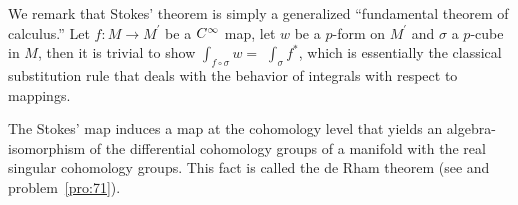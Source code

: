 \documentclass[../main]{subfiles}
\begin{document}
We remark that Stokes' theorem is simply a generalized ``fundamental theorem of calculus.'' Let $f: M \rightarrow M^{\prime}$ be a $C^\infty$ map, let $w$ be a $p$-form on $M^{\prime}$ and $\sigma$ a $p$-cube in $M$, then it is trivial to show $\int_{f \circ \sigma} w=$ $\int_{\sigma} f^\ast$, which is essentially the classical substitution rule that deals with the behavior of integrals with respect to mappings.

The Stokes' map induces a map at the cohomology level that yields an algebra-isomorphism of the differential cohomology groups of a manifold with the real singular cohomology groups. This fact is called the de Rham theorem (see \cite{Weil1952} and problem~\ref{pro:71}).
\end{document}
